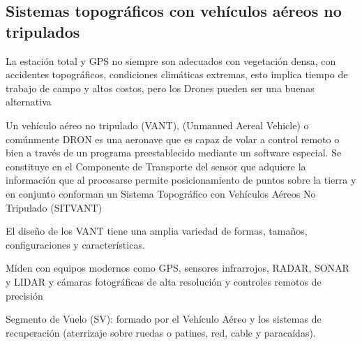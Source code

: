 %

\subsection{Sistemas topográficos con vehículos aéreos no tripulados}

La estación total y GPS no siempre son adecuados con vegetación densa, con accidentes topográficos, condiciones climáticas extremas, esto implica tiempo de trabajo de campo y altos costos, pero los Drones pueden ser una buenas alternativa

\begin{definition}[Vant]
    Un vehículo aéreo no tripulado (VANT), (Unmanned Aereal Vehicle) o comúnmente DRON es una aeronave que es capaz de volar a control remoto o bien a través de un programa preestablecido mediante un software especial.
Se constituye en el Componente de Transporte del sensor que adquiere la información que al procesarse permite posicionamiento de puntos sobre la tierra y en conjunto conforman un Sistema Topográfico con Vehículos Aéreos No Tripulado (SITVANT)
\end{definition}

El diseño de los VANT tiene una amplia variedad de formas, tamaños, configuraciones y características.

Miden con equipos modernos como GPS, sensores infrarrojos, RADAR, SONAR y LIDAR y cámaras fotográficas de alta resolución y controles remotos de precisión

Segmento de Vuelo (SV): formado por el Vehículo Aéreo y los sistemas de recuperación (aterrizaje sobre ruedas o patines, red, cable y paracaídas).

